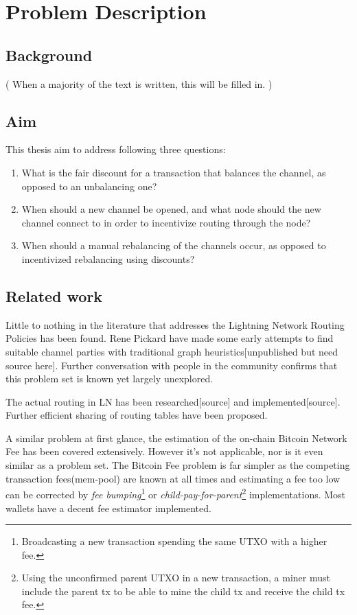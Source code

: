 \chapter{Problem Description}

\section{Background}
    \label{sec:background}

	( When a majority of the text is written, this will be filled in. )

\section{Aim}
    \label{sec:aim}

This thesis aim to address following three questions:

    \begin{enumerate}
	\item What is the fair discount for a transaction that balances the channel, as
		opposed to an unbalancing one?
	\item When should a new channel be opened, and what node should the new
		channel connect to in order to incentivize routing through the node?
	\item When should a manual rebalancing of the channels occur, as opposed to
		incentivized rebalancing using discounts?
    \end{enumerate}

\section{Related work}
    \label{sec:related_work}

	Little to nothing in the literature that addresses the Lightning Network Routing Policies has been found. Rene Pickard have made some early attempts to find suitable channel parties with traditional graph heuristics[unpublished but need source here]. Further conversation with people in the community confirms that this problem set is known yet largely unexplored.
	
	The actual routing in LN has been researched[source] and implemented[source]. Further efficient sharing of routing tables have been proposed\cite{gunspan:marco:ant}.
	
	A similar problem at first glance, the estimation of the on-chain Bitcoin Network Fee has been covered extensively. However it's not applicable, nor is it even similar as a problem set. The Bitcoin Fee problem is far simpler as the competing transaction fees(mem-pool) are known at all times and estimating a fee too low can be corrected by \textit{fee bumping}\footnote{Broadcasting a new transaction spending the same UTXO with a higher fee.} or \textit{child-pay-for-parent}\footnote{Using the unconfirmed parent UTXO in a new transaction, a miner must include the parent tx to be able to mine the child tx and receive the child tx fee.} implementations. Most wallets have a decent fee estimator implemented.
	
